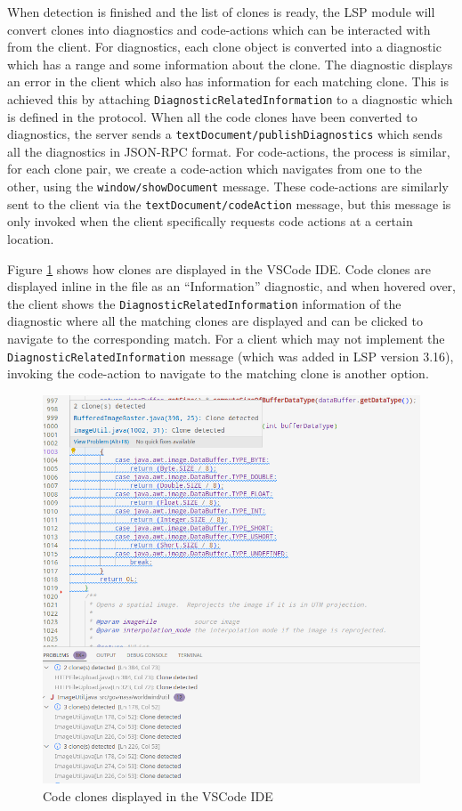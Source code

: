 When detection is finished and the list of clones is ready, the LSP module will convert
clones into diagnostics and code-actions which can be interacted with from the client. For
diagnostics, each clone object is converted into a diagnostic which has a range and some
information about the clone. The diagnostic displays an error in the client which also has
information for each matching clone. This is achieved this by attaching
\verb|DiagnosticRelatedInformation| to a diagnostic which is defined in the protocol. When
all the code clones have been converted to diagnostics, the server sends a
\verb|textDocument/publishDiagnostics| which sends all the diagnostics in JSON-RPC format.
For code-actions, the process is similar, for each clone pair, we create a code-action
which navigates from one to the other, using the \verb|window/showDocument| message. These
code-actions are similarly sent to the client via the \verb|textDocument/codeAction|
message, but this message is only invoked when the client specifically requests code
actions at a certain location.

Figure \ref{fig:vscodeclones} shows how clones are displayed in the VSCode IDE. Code
clones are displayed inline in the file as an ``Information'' diagnostic, and when hovered
over, the client shows the \verb|DiagnosticRelatedInformation| information of the diagnostic
where all the matching clones are displayed and can be clicked to navigate to the
corresponding match. For a client which may not implement the
\verb|DiagnosticRelatedInformation| message (which was added in LSP version 3.16), invoking
the code-action to navigate to the matching clone is another option.

\begin{figure}
	\includegraphics[width=\textwidth]{figures/vscodecodeclone.png}
	\caption{Code clones displayed in the VSCode IDE}
	\label{fig:vscodeclones}
\end{figure}

